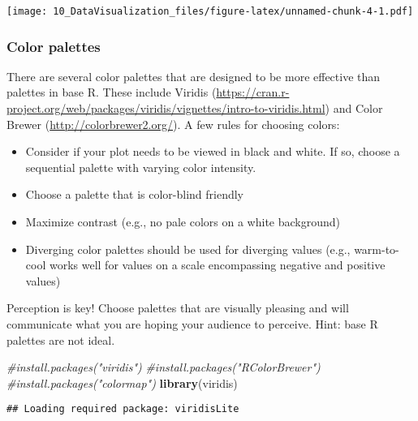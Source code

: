 \documentclass[]{article}
\newenvironment{Shaded}{\begin{snugshade}}{\end{snugshade}}
\newcommand{\KeywordTok}[1]{\textcolor[rgb]{0.13,0.29,0.53}{\textbf{#1}}}
\newcommand{\DataTypeTok}[1]{\textcolor[rgb]{0.13,0.29,0.53}{#1}}
\newcommand{\DecValTok}[1]{\textcolor[rgb]{0.00,0.00,0.81}{#1}}
\newcommand{\CommentTok}[1]{\textcolor[rgb]{0.56,0.35,0.01}{\textit{#1}}}
\newcommand{\OperatorTok}[1]{\textcolor[rgb]{0.81,0.36,0.00}{\textbf{#1}}}
\newcommand{\NormalTok}[1]{#1}
\providecommand{\tightlist}{%
  \setlength{\itemsep}{0pt}\setlength{\parskip}{0pt}}
\begin{document}
\texttt{[image: 10\_DataVisualization\_files/figure-latex/unnamed-chunk-4-1.pdf]}

\subsubsection{Color palettes}\label{color-palettes}

There are several color palettes that are designed to be more effective
than palettes in base R. These include Viridis
(\url{https://cran.r-project.org/web/packages/viridis/vignettes/intro-to-viridis.html})
and Color Brewer (\url{http://colorbrewer2.org/}). A few rules for
choosing colors:

\begin{itemize}
\tightlist
\item
  Consider if your plot needs to be viewed in black and white. If so,
  choose a sequential palette with varying color intensity.
\item
  Choose a palette that is color-blind friendly
\item
  Maximize contrast (e.g., no pale colors on a white background)
\item
  Diverging color palettes should be used for diverging values (e.g.,
  warm-to-cool works well for values on a scale encompassing negative
  and positive values)
\end{itemize}

Perception is key! Choose palettes that are visually pleasing and will
communicate what you are hoping your audience to perceive. Hint: base R
palettes are not ideal.

\begin{Shaded}
\begin{Highlighting}[]
\CommentTok{#install.packages("viridis")}
\CommentTok{#install.packages("RColorBrewer")}
\CommentTok{#install.packages("colormap")}
\KeywordTok{library}\NormalTok{(viridis)}
\end{Highlighting}
\end{Shaded}

\begin{verbatim}
## Loading required package: viridisLite
\end{verbatim}

\begin{Shaded}
\end{Shaded}
\end{document}
